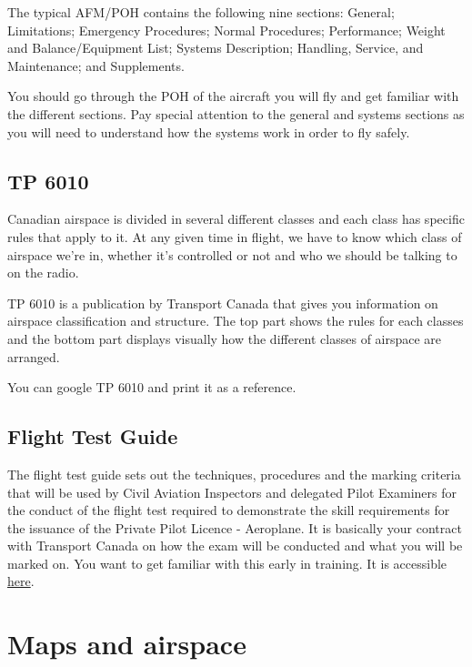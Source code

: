 \documentclass[12pt,letterpaper]{article}
\begin{document}
        The typical AFM/POH contains the following nine sections: General;
        Limitations; Emergency Procedures; Normal Procedures;
        Performance; Weight and Balance/Equipment List; Systems
        Description; Handling, Service, and Maintenance; and
        Supplements.
        
        You should go through the POH of the aircraft you will fly and get familiar with the different sections. Pay special attention to the general and systems sections as you will need to understand how the systems work in order to fly safely.
        
        \subsection{TP 6010}
        
        Canadian airspace is divided in several different classes and each class has specific rules that apply to it. At any given time in flight, we have to know which class of airspace we're in, whether it's controlled or not and who we should be talking to on the radio.
        
        TP 6010 is a publication by Transport Canada that gives you information on airspace classification and structure. The top part shows the rules for each classes and the bottom part displays visually how the different classes of airspace are arranged.
        
        You can google TP 6010 and print it as a reference.
        
        \subsection{Flight Test Guide}
        The flight test guide sets out the techniques, procedures and the marking criteria that will be used by Civil Aviation Inspectors and delegated Pilot Examiners for the conduct of the flight test required to demonstrate the skill requirements for the issuance of the Private Pilot Licence - Aeroplane. It is basically your contract with Transport Canada on how the exam will be conducted and what you will be marked on. You want to get familiar with this early in training. It is accessible \href{https://tc.canada.ca/en/aviation/publications/flight-test-guide-private-pilot-licence-aeroplane-tp-13723}{\color{cyan}here}.
        
    
\section{Maps and airspace}
\end{document}
